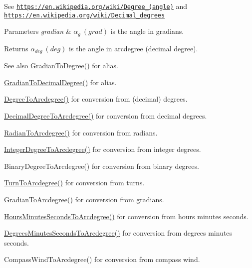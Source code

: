 See \href{https://en.wikipedia.org/wiki/Degree_(angle)}{\tt https\+://en.\+wikipedia.\+org/wiki/\+Degree\+\_\+(angle)} and \href{https://en.wikipedia.org/wiki/Decimal_degrees}{\tt https\+://en.\+wikipedia.\+org/wiki/\+Decimal\+\_\+degrees} 
\begin{DoxyParams}{Parameters}
{\em gradian} & $\alpha_{g}\ (grad)$ is the angle in gradians. \\
\hline
\end{DoxyParams}
\begin{DoxyReturn}{Returns}
$\alpha_{deg}\ (deg)$ is the angle in arcdegree (decimal degree). 
\end{DoxyReturn}
\begin{DoxySeeAlso}{See also}
\mbox{\hyperlink{group___e_g_x_math-_conversions-_angle_conversions-_gradian_gaa284952274f16d225951cf5139d0ff4e}{Gradian\+To\+Degree()}} for alias. 

\mbox{\hyperlink{group___e_g_x_math-_conversions-_angle_conversions-_gradian_ga346f47c519d5261b689cec49f4a8e789}{Gradian\+To\+Decimal\+Degree()}} for alias. 

\mbox{\hyperlink{group___e_g_x_math-_conversions-_angle_conversions-_degree_gac1b5f3b68f66c77a6df4ceef842c9b19}{Degree\+To\+Arcdegree()}} for conversion from (decimal) degrees. 

\mbox{\hyperlink{group___e_g_x_math-_conversions-_angle_conversions-_decimal_degree_gacdd463fcabffeb598ebda65b012ce743}{Decimal\+Degree\+To\+Arcdegree()}} for conversion from decimal degrees. 

\mbox{\hyperlink{group___e_g_x_math-_conversions-_angle_conversions-_radian_ga3dfdc97357cc07f8379976bbc08f9852}{Radian\+To\+Arcdegree()}} for conversion from radians. 

\mbox{\hyperlink{group___e_g_x_math-_conversions-_angle_conversions-_integer_degree_gaf633d0b82bfb7586ce86ffbcf78d8f7a}{Integer\+Degree\+To\+Arcdegree()}} for conversion from integer degrees. 

Binary\+Degree\+To\+Arcdegree() for conversion from binary degrees. 

\mbox{\hyperlink{group___e_g_x_math-_conversions-_angle_conversions-_turn_ga7bdc3a81ce316dd47b1a3179489fa195}{Turn\+To\+Arcdegree()}} for conversion from turns. 

\mbox{\hyperlink{group___e_g_x_math-_conversions-_angle_conversions-_gradian_gacd0b1797f2460944dcbc541a855ec21c}{Gradian\+To\+Arcdegree()}} for conversion from gradians. 

\mbox{\hyperlink{group___e_g_x_math-_conversions-_angle_conversions-_hours_minutes_seconds_ga3c38143df47da88534ddbd13726748e2}{Hours\+Minutes\+Seconds\+To\+Arcdegree()}} for conversion from hours minutes seconds. 

\mbox{\hyperlink{group___e_g_x_math-_conversions-_angle_conversions-_degrees_minutes_seconds_ga71fd0a3b9238a3a4fde150802938dee8}{Degrees\+Minutes\+Seconds\+To\+Arcdegree()}} for conversion from degrees minutes seconds. 

Compass\+Wind\+To\+Arcdegree() for conversion from compass wind. 
\end{DoxySeeAlso}
